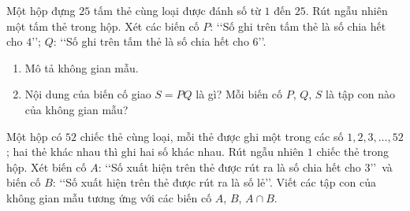 \begin{bt}[Mức 2]%
	Một hộp đựng $25$ tấm thẻ cùng loại được đánh số từ $1$ đến $25$. Rút ngẫu nhiên một tấm thẻ trong hộp. Xét các biến cố $P$: \lq\lq Số ghi trên tấm thẻ là số chia hết cho $4$\rq\rq; $Q$: \lq\lq Số ghi trên tấm thẻ là số chia hết cho $6$\rq\rq.
	\begin{enumerate}
		\item Mô tả không gian mẫu.
		\item Nội dung của biến cố giao $S=P Q$ là gì? Mỗi biến cố $P$, $Q$, $S$ là tập con nào của không gian mẫu?
	\end{enumerate} 
\end{bt}

\begin{bt}[Mức 2]%
	Một hộp có $52$ chiếc thẻ cùng loại, mỗi thẻ được ghi một trong các số $1,2,3, \ldots, 52$; hai thẻ khác nhau thì ghi hai số khác nhau. Rút ngẫu nhiên $1$ chiếc thẻ trong hộp. Xét biến cố $A$: \lq\lq Số xuất hiện trên thẻ được rút ra là số chia hết cho 3\rq\rq \, và biến cố $B$: \lq\lq Số xuất hiện trên thẻ được rút ra là số lẻ\rq\rq. Viết các tập con của không gian mẫu tương ứng với các biến cố $A$, $B$, $A \cap B$.
\end{bt}

